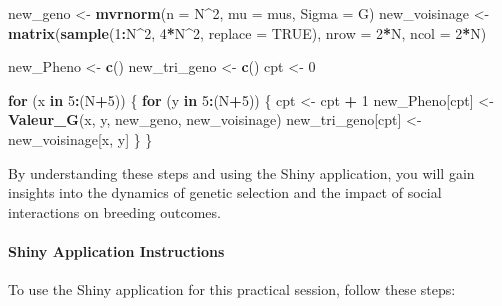 \documentclass[
]{article}
\newenvironment{Shaded}{\begin{snugshade}}{\end{snugshade}}
\newcommand{\AttributeTok}[1]{\textcolor[rgb]{0.13,0.29,0.53}{#1}}
\newcommand{\ConstantTok}[1]{\textcolor[rgb]{0.56,0.35,0.01}{#1}}
\newcommand{\ControlFlowTok}[1]{\textcolor[rgb]{0.13,0.29,0.53}{\textbf{#1}}}
\newcommand{\DecValTok}[1]{\textcolor[rgb]{0.00,0.00,0.81}{#1}}
\newcommand{\FunctionTok}[1]{\textcolor[rgb]{0.13,0.29,0.53}{\textbf{#1}}}
\newcommand{\NormalTok}[1]{#1}
\newcommand{\OtherTok}[1]{\textcolor[rgb]{0.56,0.35,0.01}{#1}}
\newcommand{\SpecialCharTok}[1]{\textcolor[rgb]{0.81,0.36,0.00}{\textbf{#1}}}
\begin{document}
\begin{enumerate}
\begin{Shaded}
\begin{Highlighting}[]
\NormalTok{new\_geno }\OtherTok{\textless{}{-}} \FunctionTok{mvrnorm}\NormalTok{(}\AttributeTok{n =}\NormalTok{ N}\SpecialCharTok{\^{}}\DecValTok{2}\NormalTok{, }\AttributeTok{mu =}\NormalTok{ mus, }\AttributeTok{Sigma =}\NormalTok{ G)}
\NormalTok{new\_voisinage }\OtherTok{\textless{}{-}} \FunctionTok{matrix}\NormalTok{(}\FunctionTok{sample}\NormalTok{(}\DecValTok{1}\SpecialCharTok{:}\NormalTok{N}\SpecialCharTok{\^{}}\DecValTok{2}\NormalTok{, }\DecValTok{4}\SpecialCharTok{*}\NormalTok{N}\SpecialCharTok{\^{}}\DecValTok{2}\NormalTok{, }\AttributeTok{replace =} \ConstantTok{TRUE}\NormalTok{), }\AttributeTok{nrow =} \DecValTok{2}\SpecialCharTok{*}\NormalTok{N, }\AttributeTok{ncol =} \DecValTok{2}\SpecialCharTok{*}\NormalTok{N)}

\NormalTok{new\_Pheno }\OtherTok{\textless{}{-}} \FunctionTok{c}\NormalTok{()}
\NormalTok{new\_tri\_geno }\OtherTok{\textless{}{-}} \FunctionTok{c}\NormalTok{()}
\NormalTok{cpt }\OtherTok{\textless{}{-}} \DecValTok{0}

\ControlFlowTok{for}\NormalTok{ (x }\ControlFlowTok{in} \DecValTok{5}\SpecialCharTok{:}\NormalTok{(N}\SpecialCharTok{+}\DecValTok{5}\NormalTok{)) \{}
    \ControlFlowTok{for}\NormalTok{ (y }\ControlFlowTok{in} \DecValTok{5}\SpecialCharTok{:}\NormalTok{(N}\SpecialCharTok{+}\DecValTok{5}\NormalTok{)) \{}
\NormalTok{        cpt }\OtherTok{\textless{}{-}}\NormalTok{ cpt }\SpecialCharTok{+} \DecValTok{1}
\NormalTok{        new\_Pheno[cpt] }\OtherTok{\textless{}{-}} \FunctionTok{Valeur\_G}\NormalTok{(x, y, new\_geno, new\_voisinage)}
\NormalTok{        new\_tri\_geno[cpt] }\OtherTok{\textless{}{-}}\NormalTok{ new\_voisinage[x, y]}
\NormalTok{    \}}
\NormalTok{\}}
\end{Highlighting}
\end{Shaded}
\end{enumerate}

By understanding these steps and using the Shiny application, you will
gain insights into the dynamics of genetic selection and the impact of
social interactions on breeding outcomes.

\paragraph{Shiny Application
Instructions}\label{shiny-application-instructions}

To use the Shiny application for this practical session, follow these
steps:
\end{document}
